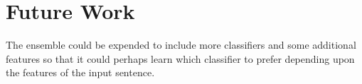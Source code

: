 \section{Future Work}
\label{sec:future_work}

The ensemble could be expended to include more classifiers and some additional
features so that it could perhaps learn which classifier to prefer depending
upon the features of the input sentence.

